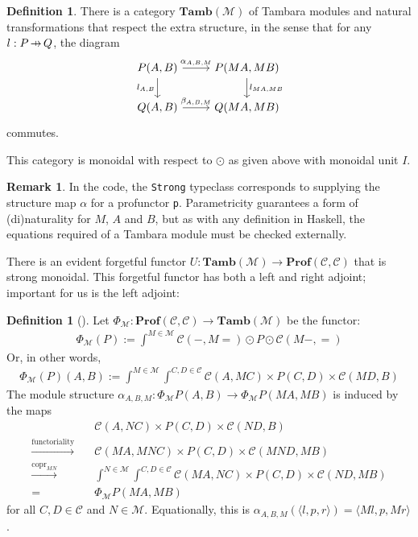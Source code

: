 \documentclass[11pt,a4paper]{article}
\theoremstyle{plain}
\theoremstyle{definition}
\newtheorem{definition}[theorem]{Definition}
\newtheorem{remark}[theorem]{Remark}
\newcommand{\C}{\mathscr{C}}
\newcommand{\M}{\mathscr{M}}
\newcommand{\Pastro}{\Phi}
\newcommand{\Prof}{\mathbf{Prof}}
\newcommand{\Tamb}{\mathbf{Tamb}}
\DeclareMathOperator{\copr}{copr}
\newcommand{\hto}{\ensuremath{\,\mathaccent\shortmid\rightarrow\,}}
\begin{document}
\begin{definition}
  There is a category $\Tamb(\M)$ of Tambara modules and natural transformations that respect the extra structure, in the sense that for any $l : P \hto Q$, the diagram
  \[
    \begin{tikzcd}
      P(A,B) \ar[r, "\alpha_{A,B,M}"] \ar[d, "l_{A,B}" left] & P(MA, MB) \ar[d, "l_{MA, MB}" right] \\
      Q(A,B) \ar[r, "\beta_{A,B,M}"] & Q(MA, MB)
    \end{tikzcd}
  \]
  commutes.
\end{definition}

This category is monoidal with respect to $\odot$ as given above with monoidal unit $I$.

\begin{remark}
  In the code, the \texttt{Strong} typeclass corresponds to supplying the structure map $\alpha$ for a profunctor \texttt{p}. Parametricity guarantees a form of (di)naturality for $M$, $A$ and $B$, but as with any definition in Haskell, the equations required of a Tambara module must be checked externally.
\end{remark}

There is an evident forgetful functor $U : \Tamb(\M) \to \Prof(\C, \C)$ that is strong monoidal. This forgetful functor has both a left and right adjoint; important for us is the left adjoint:

\begin{definition}[{\cite[Section 5]{Doubles}}]
  Let $\Pastro_\M : \Prof(\C, \C) \to \Tamb(\M)$ be the functor:
  \begin{align*}
    \Pastro_\M(P) := \int^{M \in \M}  \C(-, M{=}) \odot P \odot \C(M-, {=})
  \end{align*}
  Or, in other words,
  \begin{align*}
    \Pastro_\M(P)(A,B) := \int^{M \in \M} \int^{C,D \in \C} \C(A, MC) \times P(C,D) \times  \C(MD, B)
  \end{align*}
  The module structure $\alpha_{A,B,M} : \Pastro_\M P(A,B) \to \Pastro_\M P (MA, MB)
  $ is induced by the maps
  \begin{align*}
    &\C(A, NC) \times P(C,D) \times  \C(ND, B) \\
    \xrightarrow{\text{functoriality}} \quad& \C(MA, MNC) \times P(C,D) \times  \C(MND, MB) \\
    \xrightarrow{\copr_{MN}} \quad&\int^{N \in \M} \int^{C,D \in \C} \C(MA, NC) \times P(C,D) \times  \C(ND, MB) \\
    = \quad&\Pastro_\M P (MA, MB)
  \end{align*}
  for all $C, D \in \C$ and $N \in \M$. Equationally, this is $\alpha_{A,B,M}(\langle l, p, r \rangle) = \langle Ml, p, Mr \rangle$.
\end{definition}
\end{document}

